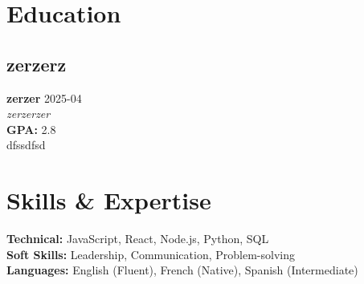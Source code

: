 \documentclass[11pt,a4paper]{article}
\begin{document}

\section{Education}

\subsection{zerzerz}
\textcolor{primary}{\textbf{zerzer}} \hfill \textcolor{secondary}{2025-04}\\
\textit{zerzerzer}\\
\textbf{GPA:} 2.8\\
dfssdfsd\\




\section{Skills \& Expertise}
\textcolor{primary}{\textbf{Technical:}} JavaScript, React, Node.js, Python, SQL\\
\textcolor{primary}{\textbf{Soft Skills:}} Leadership, Communication, Problem-solving\\
\textcolor{primary}{\textbf{Languages:}} English (Fluent), French (Native), Spanish (Intermediate)\\


\end{document}
